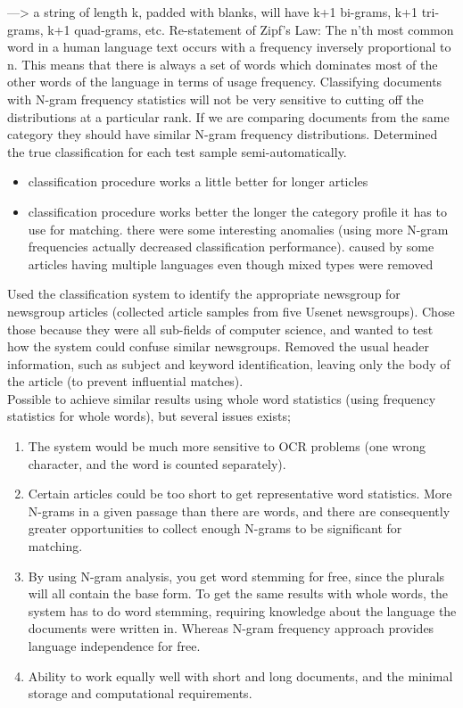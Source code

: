 ---> a string of length k, padded with blanks, will have k+1 bi-grams, k+1 tri-grams, k+1 quad-grams, etc.
Re-statement of Zipf's Law: The n'th most common word in a human language text occurs with a frequency inversely proportional to n. 
This means that there is always a set of words which dominates most of the other words of the language in terms of usage frequency. 
Classifying documents with N-gram frequency statistics will not be very sensitive to cutting off the distributions at a particular rank. 
If we are comparing documents from the same category they  should have similar N-gram frequency distributions.
Determined the true classification for each test sample semi-automatically.
\begin{itemize}
	\item classification procedure works a little better for longer articles
	\item classification procedure works better the longer the category profile it has to use for matching. 
	there were some interesting anomalies (using more N-gram frequencies actually decreased classification performance). 
	caused by some articles having multiple languages even though mixed types were removed
\end{itemize}
Used the classification system to identify the appropriate newsgroup for newsgroup articles (collected article samples from five Usenet newsgroups).
Chose those because they were all sub-fields of computer science, and wanted to test how the system could confuse similar newsgroups.
Removed the usual header information, such as subject and keyword identification, leaving only the body of the article (to prevent influential matches). \\
Possible to achieve similar results using whole word statistics (using frequency statistics for whole words), but several issues exists;
\begin{enumerate}
	\item The system would be much more sensitive to OCR problems (one wrong character, and the word is counted separately). 
	\item Certain articles could be too short to get representative word statistics. 
	More N-grams in a given passage than there are words, and there are consequently greater opportunities to collect enough N-grams to be significant for matching.
	\item By using N-gram analysis, you get word stemming for free, since the plurals will all contain the base form. 
	To get the same results with whole words, the system has to do word stemming, requiring knowledge about the language the documents were written in.  
	Whereas N-gram frequency approach provides language independence for free.
	\item Ability to work equally well with short and long documents, and the minimal storage and computational requirements.
\end{enumerate}
\cite{Cavnar1994}





